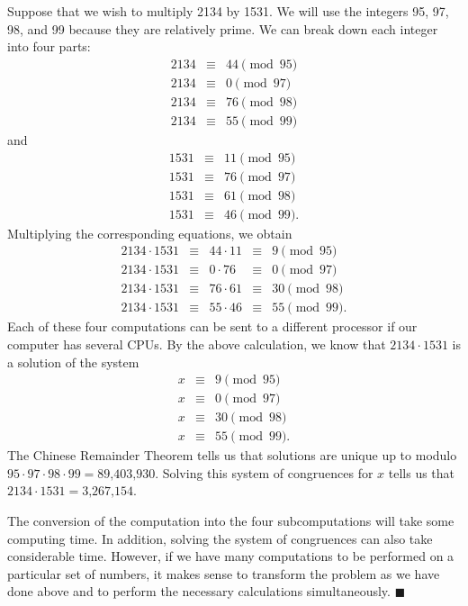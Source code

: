  
\vspace{2ex}
 
 
Suppose that we wish to multiply 2134 by 1531. We will use the integers
95, 97, 98, and 99 because they are relatively prime. We can break down
each integer into four parts:
\begin{eqnarray*}
2134 & \equiv & 44 \pmod{95} \\
2134 & \equiv & 0 \pmod{97} \\
2134 & \equiv & 76 \pmod{98} \\
2134 & \equiv & 55 \pmod{99} 
\end{eqnarray*}
and
\begin{eqnarray*}
1531 & \equiv & 11 \pmod{95} \\
1531 & \equiv & 76 \pmod{97} \\
1531 & \equiv & 61 \pmod{98} \\
1531 & \equiv & 46 \pmod{99}. 
\end{eqnarray*}
Multiplying the corresponding equations, we obtain
\[
\begin{array}{rcccl}
2134 \cdot 1531 & \equiv & 44 \cdot 11 & \equiv & 9 \pmod{95} \\
2134 \cdot 1531 & \equiv & 0  \cdot 76 & \equiv & 0 \pmod{97} \\
2134 \cdot 1531 & \equiv & 76 \cdot 61 & \equiv & 30 \pmod{98} \\
2134 \cdot 1531 & \equiv & 55 \cdot 46 & \equiv & 55 \pmod{99}. 
\end{array}
\]
Each of these four computations can be sent to a different processor
if our computer has several CPUs. By the above calculation, we know
that \mbox{$2134 \cdot 1531$} is a solution of the system
\begin{eqnarray*}
x & \equiv & 9 \pmod{95} \\
x & \equiv & 0 \pmod{97} \\
x & \equiv & 30 \pmod{98} \\
x & \equiv & 55 \pmod{99}. 
\end{eqnarray*}
The Chinese Remainder Theorem tells us that solutions are unique up to
modulo $95 \cdot 97 \cdot 98 \cdot 99 = \mbox{89,403,930}$. Solving
this system of congruences for $x$ tells us that $2134 \cdot 1531 =
\mbox{3,267,154}$.  
 
 
The conversion of the computation into the four subcomputations will
take some computing time.  In addition, solving the system of
congruences can also take considerable time.  However, if we have
many computations to be performed on a particular set of numbers, it
makes sense to transform the problem as we have done above and to perform
the necessary calculations simultaneously.
\hspace{\fill} $\blacksquare$
 
